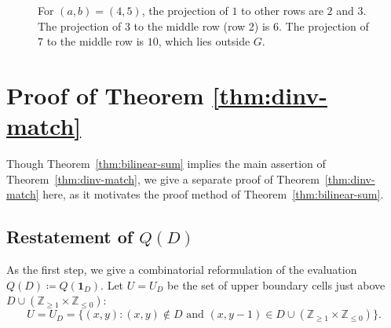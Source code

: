 \documentclass[11pt,reqno]{amsart}
\theoremstyle{remark}
\begin{document}
\begin{figure}[h]
    \centering
    \caption{For $(a,b)=(4,5)$, the projection of $1$ to other rows are $2$ and $3$. The projection of $3$ to the middle row (row 2) is $6$. The projection of $7$ to the middle row is $10$, which lies outside $G$.}
    \label{fig:proj}
\end{figure}


\section{Proof of Theorem \ref{thm:dinv-match}}
Though Theorem~\ref{thm:bilinear-sum} implies the main assertion of Theorem~\ref{thm:dinv-match}, we give a separate proof of Theorem~\ref{thm:dinv-match} here, as it motivates the proof method of Theorem~\ref{thm:bilinear-sum}.

\subsection{Restatement of $Q(D)$}
As the first step, we give a combinatorial reformulation of the evaluation $Q(D)\coloneq Q(\mathbf{1}_D)$. Let $U=U_D$ be the set of upper boundary cells just above $D\cup (\mathbb{Z}_{\geq 1}\times \mathbb{Z}_{\leq 0})$:
\begin{equation}\label{eq:U}
    U=U_D=\{(x,y): (x,y)\notin D \text{ and } (x,y-1) \in D \cup (\mathbb{Z}_{\geq 1}\times \mathbb{Z}_{\leq 0})\}.
\end{equation}
\end{document}

